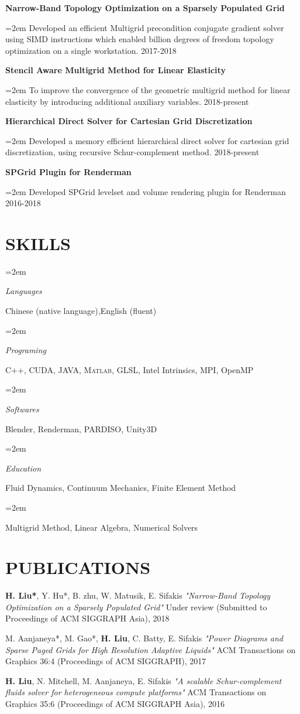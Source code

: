 \documentclass[paper=a4,fontsize=10pt]{scrartcl} %
\newlength{\spacebox}
\newcommand{\NewPart}[1]{\section*{\uppercase{#1}}\vspace*{-0.3em}}
\newcommand{\PersonalEntry}[2]{
		\noindent\hangindent=2em\hangafter=0 %
		\parbox{\spacebox}{        %
		\textit{#1}}		       %
		\hspace{1.5em} #2 \par}    %
\newcommand{\SkillsEntry}[2]{      %
		\noindent\hangindent=2em\hangafter=0 %
		\parbox{\spacebox}{        %
		\textit{#1}}			   %
		\hspace{1.5em} #2 \par}    %
\newcommand{\ReferenceEntry}[4]{				  %
		\noindent\hangindent=2em\hangafter=0\textbf{#1} #2 \par  %
		\hspace{2.5em} \textit{#3} \par              %
		\hspace{2.5em} \small #4 %
		\normalsize \par}
\newcommand{\EducationEntry}[4]{
		\noindent \textbf{#1} \hfill      %
		\colorbox{White}{%
			\parbox{6em}{%
			\hfill\color{Black}#2}} \par  %
		\noindent \textit{#3} \par        %
		\noindent\hangindent=2em\hangafter=0 \small #4 %
		\normalsize \par}
\newcommand{\ResearchEntry}[3]{				  %
		\noindent \textbf{#1} \hfill    \par%
		\noindent\hangindent=2em\hangafter=0 \small #3 %
		\hfill \colorbox{White}{\color{Black}#2}   %
		\normalsize \par}
\newcommand{\Publication}[3]{	\indent	  
		\noindent #1\small       %
		\noindent \textit{#2} %
		\noindent #3\small \par              %
		\normalsize \par}
\begin{document}
\ResearchEntry{Narrow-Band Topology Optimization on a Sparsely Populated Grid}{2017-2018}{Developed an efficient Multigrid precondition conjugate gradient solver using SIMD instructions which enabled billion degrees of freedom topology optimization on a single workstation.}
\ResearchEntry{Stencil Aware Multigrid Method for Linear Elasticity}{2018-present}{To improve the convergence of the geometric multigrid method for linear elasticity by introducing additional auxiliary variables.}
\ResearchEntry{Hierarchical Direct Solver for Cartesian Grid Discretization}{2018-present}{Developed a memory efficient hierarchical direct solver for cartesian grid discretization, using recursive Schur-complement method. }
\ResearchEntry{SPGrid Plugin for Renderman\texttrademark}{2016-2018}{Developed SPGrid levelset and volume rendering plugin for Renderman\texttrademark}
\vspace*{-1.2em}
\NewPart{Skills}{}
\SkillsEntry{Languages}{Chinese (native language),English (fluent)}
\SkillsEntry{Programing}{\textsc{C++}, \textsc{CUDA},  \textsc{JAVA}, \textsc{Matlab}, GLSL, Intel Intrinsics, MPI, OpenMP}
\SkillsEntry{Softwares} {Blender, Renderman, PARDISO, Unity3D}
\SkillsEntry{Education}{Fluid Dynamics, Continuum Mechanics, Finite Element Method}
\SkillsEntry{}{Multigrid Method, Linear Algebra, Numerical Solvers}
\vspace*{-1.2em}
\NewPart{Publications}{}
\Publication{\textbf{H. Liu*}, Y. Hu*, B. zhu, W. Matusik, E. Sifakis}{ "Narrow-Band Topology Optimization on a Sparsely Populated Grid"}{ Under review (Submitted to Proceedings of ACM SIGGRAPH Asia), 2018}
\Publication{M. Aanjaneya*, M. Gao*, \textbf{H. Liu}, C. Batty, E. Sifakis }{"Power Diagrams and Sparse Paged Grids for High Resolution Adaptive Liquids"}{ACM Transactions on Graphics 36:4 (Proceedings of ACM SIGGRAPH), 2017}
\Publication{\textbf{H. Liu}, N. Mitchell, M. Aanjaneya, E. Sifakis}{ "A scalable Schur-complement fluids solver for heterogeneous compute platforms"}{ ACM Transactions on Graphics 35:6 (Proceedings of ACM SIGGRAPH Asia), 2016}
\end{document}
